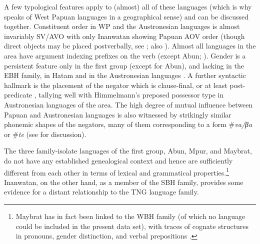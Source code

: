 A few typological features apply to (almost) all of these languages (which is why \citealt{reesink2005west} speaks of West Papuan languages in a geographical sense) and can be discussed together. Constituent order in WP  and the Austronesian languages is almost invariably SV/AVO with only Inanwatan showing Papuan AOV order (though direct objects may be placed postverbally, see \citealt[195]{reesink2005west}; also \citealt[52f.]{devries2004}). Almost all languages in the area have argument indexing prefixes on the verb (except Abun; \citealt[5]{dol2007grammar}). Gender is a persistent feature only in the first group (except for Abun), and lacking in the \textsc{EBH} family, in Hatam and in the Austronesian languages \citep[205]{reesink2005west}. A further syntactic hallmark is the placement of the negator which is clause-final, or at least post-predicate \citep[199]{reesink2005west}, tallying well with Himmelmann's  preposed possessor type in Austronesian languages of the area. The high degree of mutual influence between Papuan and Austronesian languages is also witnessed by strikingly similar phonemic shapes of the negators, many of them corresponding to a form \#\textit{va/βa} or \#\textit{te} (see  \citealt[199]{reesink2005west} for discussion).

The three family-isolate languages of the first group, Abun, Mpur, and Maybrat, do not have any established genealogical context and hence are sufficiently different from each other in terms of lexical and grammatical properties.\footnote{Maybrat has in fact been linked to the \textsc{WBH} family (of which no language could be included in the present data set), with traces of cognate structures in pronouns, gender distinction, and verbal prepositions \citep[187]{reesink2005west}.} Inanwatan, on the other hand, as a member of the SBH family, provides some evidence for a distant relationship to the TNG language family. 

